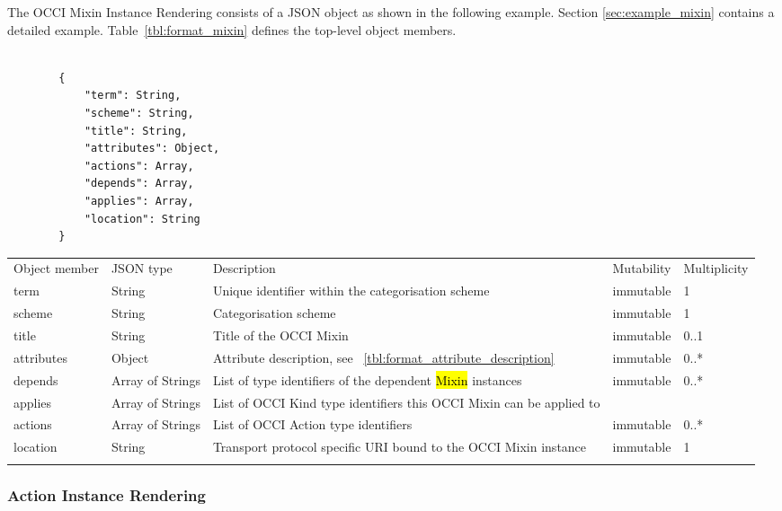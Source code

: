 \documentclass[10pt,a4paper]{article}
\begin{document}
The OCCI Mixin Instance Rendering consists of a JSON object as shown in the following example. Section \ref{sec:example_mixin} contains a detailed example.
Table~\ref{tbl:format_mixin} defines the top-level object members.

\begin{lstlisting}

        {
            "term": String,
            "scheme": String,
            "title": String,
            "attributes": Object,
            "actions": Array,
            "depends": Array,
            "applies": Array,
            "location": String
        }

\end{lstlisting}

 {
    \begin{tabularx}{\textwidth}{llXll}
    \toprule
    Object member & JSON type & Description & Mutability & Multiplicity \\
    \colrule
    term & String & Unique identifier within the categorisation scheme &
immutable & 1 \\

    scheme & String & Categorisation scheme & immutable & 1 \\

    title & String & Title of the OCCI Mixin & immutable & 0..1 \\

    attributes & Object & Attribute description, see
~\ref{tbl:format_attribute_description} & immutable & 0..* \\

    depends & Array of Strings & List of type identifiers of the dependent
 \hl{Mixin} instances & immutable & 0..* \\

    applies & Array of Strings & List of OCCI Kind type identifiers this OCCI
Mixin can be applied to \\

    actions & Array of Strings & List of OCCI Action type identifiers
& immutable & 0..* \\

    location & String & Transport protocol specific URI bound to the OCCI Mixin
instance & immutable & 1 \\
    \botrule
    \end{tabularx}
}

\subsubsection{Action Instance Rendering}
\label{sec:format_action}
\end{document}
